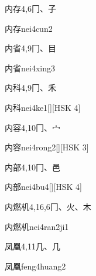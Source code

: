\begin{entry}{内存}{4,6}{⼌、⼦}
  \begin{phonetics}{内存}{nei4cun2}
  \end{phonetics}
\end{entry}

\begin{entry}{内省}{4,9}{⼌、⽬}
  \begin{phonetics}{内省}{nei4xing3}
  \end{phonetics}
\end{entry}

\begin{entry}{内科}{4,9}{⼌、⽲}
  \begin{phonetics}{内科}{nei4ke1}[][HSK 4]
  \end{phonetics}
\end{entry}

\begin{entry}{内容}{4,10}{⼌、⼧}
  \begin{phonetics}{内容}{nei4rong2}[][HSK 3]
  \end{phonetics}
\end{entry}

\begin{entry}{内部}{4,10}{⼌、⾢}
  \begin{phonetics}{内部}{nei4bu4}[][HSK 4]
  \end{phonetics}
\end{entry}

\begin{entry}{内燃机}{4,16,6}{⼌、⽕、⽊}
  \begin{phonetics}{内燃机}{nei4ran2ji1}
  \end{phonetics}
\end{entry}

\begin{entry}{凤凰}{4,11}{⼏、⼏}
  \begin{phonetics}{凤凰}{feng4huang2}
  \end{phonetics}
\end{entry}

